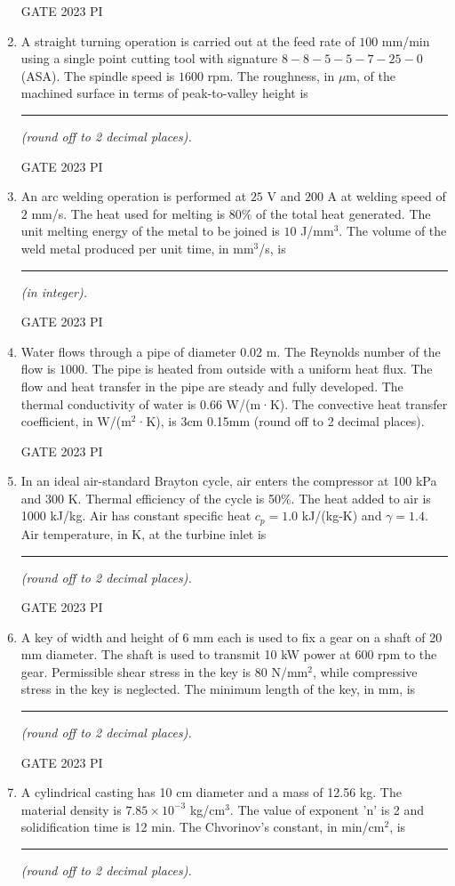 \documentclass[journal,12pt,onecolumn]{IEEEtran}
\theoremstyle{remark}
\begin{document}
\begin{enumerate}
\hfill{GATE 2023 PI}

\item A straight turning operation is carried out at the feed rate of $100$ mm/min using a single point cutting tool with signature $8-8-5-5-7-25-0$ (ASA). The spindle speed is $1600$ rpm. The roughness, in $\mu$m, of the machined surface in terms of peak-to-valley height is \rule{3cm}{0.15mm} \textit{(round off to 2 decimal places).}

\hfill{GATE 2023 PI}

\item An arc welding operation is performed at $25$ V and $200$ A at welding speed of $2$ mm/s. The heat used for melting is $80\%$ of the total heat generated. The unit melting energy of the metal to be joined is $10$ J/mm$^3$. The volume of the weld metal produced per unit time, in mm$^3$/s, is \rule{3cm}{0.15mm} \textit{(in integer).}

\hfill{GATE 2023 PI}

\item Water flows through a pipe of diameter $0.02$ m. The Reynolds number of the flow is $1000$. The pipe is heated from outside with a uniform heat flux. The flow and heat transfer in the pipe are steady and fully developed. The thermal conductivity of water is $0.66$ W/(m·K). The convective heat transfer coefficient, in W/(m$^2$·K), is 3cm 0.15mm (round off to 2 decimal places).

\hfill{GATE 2023 PI}
\item In an ideal air-standard Brayton cycle, air enters the compressor at 100 kPa and 300 K. Thermal efficiency of the cycle is 50\%. The heat added to air is 1000 kJ/kg. Air has constant specific heat $c_p = 1.0$ kJ/(kg-K) and $\gamma = 1.4$. Air temperature, in K, at the turbine inlet is \rule{3cm}{0.15mm} \textit{(round off to 2 decimal places).}

\hfill{GATE 2023 PI}

\item A key of width and height of 6 mm each is used to fix a gear on a shaft of 20 mm diameter. The shaft is used to transmit 10 kW power at 600 rpm to the gear. Permissible shear stress in the key is 80 N/mm$^2$, while compressive stress in the key is neglected. The minimum length of the key, in mm, is \rule{3cm}{0.15mm} \textit{(round off to 2 decimal places).}

\hfill{GATE 2023 PI}

\item A cylindrical casting has 10 cm diameter and a mass of 12.56 kg. The material density is $7.85 \times 10^{-3}$ kg/cm$^3$. The value of exponent 'n' is 2 and solidification time is 12 min. The Chvorinov's constant, in min/cm$^2$, is \rule{3cm}{0.15mm} \textit{(round off to 2 decimal places).}


\end{enumerate}
\end{document}
